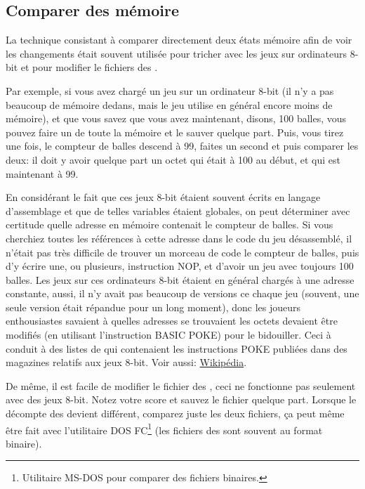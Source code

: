 \subsection{Comparer des  mémoire}
\label{snapshots_comparing}

La technique consistant à comparer directement deux états mémoire afin de voir les
changements était souvent utilisée pour tricher avec les jeux sur ordinateurs 8-bit
et pour modifier le fichiers des .

Par exemple, si vous avez chargé un jeu sur un ordinateur 8-bit (il n'y a pas beaucoup
de mémoire dedans, mais le jeu utilise en général encore moins de mémoire), et que
vous savez que vous avez maintenant, disons, 100 balles, vous pouvez faire un 
de toute la mémoire et le sauver quelque part. Puis, vous tirez une fois, le compteur
de balles descend à 99, faites un second  et puis comparer les deux:
il doit y avoir quelque part un octet qui était à 100 au début, et qui est maintenant
à 99.

En considérant le fait que ces jeux 8-bit étaient souvent écrits en langage d'assemblage
et que de telles variables étaient globales, on peut déterminer avec certitude quelle
adresse en mémoire contenait le compteur de balles. Si vous cherchiez toutes les références
à cette adresse dans le code du jeu désassemblé, il n'était pas très difficile de
trouver un morceau de code  le compteur de balles,
puis d'y écrire une, ou plusieurs, instruction \gls{NOP}, et d'avoir un jeu avec
toujours 100 balles.
Les jeux sur ces ordinateurs 8-bit étaient en général chargés à une adresse constante,
aussi, il n'y avait pas beaucoup de versions ce chaque jeu (souvent, une seule version
était répandue pour un long moment), donc les joueurs enthousiastes savaient à quelles
adresses se trouvaient les octets devaient être modifiés (en utilisant l'instruction
BASIC \gls{POKE}) pour le bidouiller. Ceci à conduit à des listes de  qui
contenaient les instructions \gls{POKE} publiées dans des magazines relatifs aux
jeux 8-bit. Voir aussi: \href{http://go.yurichev.com/17114}{Wikipédia}.


De même, il est facile de modifier le fichier des , ceci ne fonctionne
pas seulement avec des jeux 8-bit. Notez votre score et sauvez le fichier quelque part.
Lorsque le décompte des  devient différent, comparez juste les
deux fichiers, ça peut même être fait avec l'utilitaire DOS FC\footnote{Utilitaire
MS-DOS pour comparer des fichiers binaires.} (les fichiers des 
sont souvent au format binaire).

